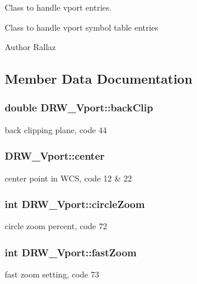 Class to handle vport entries. 

Class to handle vport symbol table entries \begin{DoxyAuthor}{Author}
Rallaz 
\end{DoxyAuthor}


\subsection{Member Data Documentation}
\hypertarget{class_d_r_w___vport_a160e2ab229be33a622e4f888eb4295c7}{}
\subsubsection[{back\+Clip}]{\setlength{\rightskip}{0pt plus 5cm}double D\+R\+W\+\_\+\+Vport\+::back\+Clip}\label{class_d_r_w___vport_a160e2ab229be33a622e4f888eb4295c7}
back clipping plane, code 44 \hypertarget{class_d_r_w___vport_a56104afc60b9fb0b8c6682982f92a45e}{}
\subsubsection[{center}]{ D\+R\+W\+\_\+\+Vport\+::center}\label{class_d_r_w___vport_a56104afc60b9fb0b8c6682982f92a45e}
center point in W\+C\+S, code 12 \& 22 \hypertarget{class_d_r_w___vport_afdff3db96e16473300e9c2d50b464267}{}
\subsubsection[{circle\+Zoom}]{\setlength{\rightskip}{0pt plus 5cm}int D\+R\+W\+\_\+\+Vport\+::circle\+Zoom}\label{class_d_r_w___vport_afdff3db96e16473300e9c2d50b464267}
circle zoom percent, code 72 \hypertarget{class_d_r_w___vport_a2e8e4ad00361daa81e7cdcd3ffc51d4f}{}
\subsubsection[{fast\+Zoom}]{\setlength{\rightskip}{0pt plus 5cm}int D\+R\+W\+\_\+\+Vport\+::fast\+Zoom}\label{class_d_r_w___vport_a2e8e4ad00361daa81e7cdcd3ffc51d4f}
fast zoom setting, code 73 \hypertarget{class_d_r_w___vport_a2ee10a71212915501bfdbaa532ec7107}{}
